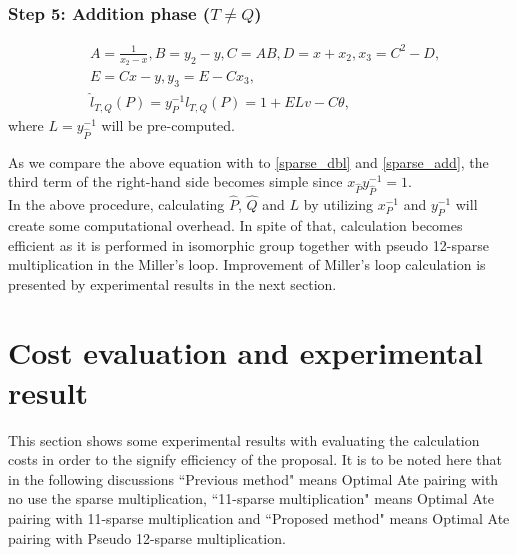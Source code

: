 \subsubsection{Step 5: Addition phase \texorpdfstring{($T\neq Q$)}{}}
\begin{eqnarray}
&A=\frac{1}{x_2-x}, B=y_2-y, C=AB, D=x+x_2, x_3=C^2-D,\nonumber\\
&E=Cx-y, y_3=E-Cx_3,\nonumber\\
&\hat{l}_{T,Q}(P) = y^{-1}_Pl_{T,Q}(P)=1+ELv-C\theta,\label{pseudo_add}
\end{eqnarray}
where $L=y_{\hat{P}}^{-1}$ will be pre-computed.

As we compare the above equation with to \eqref{sparse_dbl} and \eqref{sparse_add}, the third term of the right-hand side becomes simple since $x_{\hat{P}}y_{\hat{P}}^{-1}=1$.\\
In the above procedure, calculating $\hat{P}$, $\hat{Q}$ and $L$ by utilizing $x_P^{-1}$ and $y_P^{-1}$ will create some computational overhead. In spite of that, calculation becomes efficient as it is performed in isomorphic group together with pseudo 12-sparse multiplication in the Miller's loop. Improvement of Miller's loop calculation is presented by experimental results in the next section. 


\section{Cost evaluation and experimental result}
This section shows some experimental results with evaluating the calculation costs in order to the signify efficiency of the proposal.
It is to be noted here that in the following discussions ``Previous method" means Optimal Ate pairing with no use the sparse multiplication, ``11-sparse multiplication" means Optimal Ate pairing with 11-sparse multiplication and ``Proposed method" means Optimal Ate pairing with Pseudo 12-sparse multiplication.
